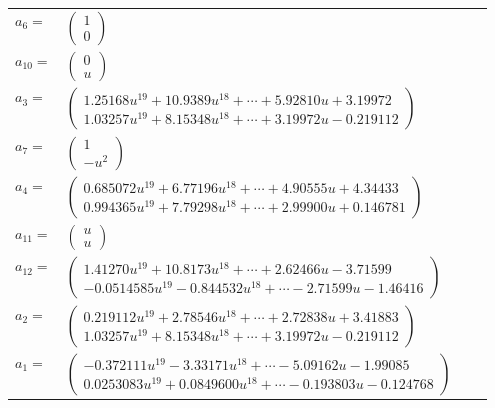 \documentclass[1p]{elsarticle_modified}
\theoremstyle{definition}
\begin{document}
\begin{tabular}{m{7pt} m{180pt} m{7pt} m{180pt} }
\flushright $a_{6}=$&$\begin{pmatrix}1\\0\end{pmatrix}$ \\
\flushright $a_{10}=$&$\begin{pmatrix}0\\u\end{pmatrix}$ \\
\flushright $a_{3}=$&$\begin{pmatrix}1.25168 u^{19}+10.9389 u^{18}+\cdots+5.92810 u+3.19972\\1.03257 u^{19}+8.15348 u^{18}+\cdots+3.19972 u-0.219112\end{pmatrix}$ \\
\flushright $a_{7}=$&$\begin{pmatrix}1\\- u^2\end{pmatrix}$ \\
\flushright $a_{4}=$&$\begin{pmatrix}0.685072 u^{19}+6.77196 u^{18}+\cdots+4.90555 u+4.34433\\0.994365 u^{19}+7.79298 u^{18}+\cdots+2.99900 u+0.146781\end{pmatrix}$ \\
\flushright $a_{11}=$&$\begin{pmatrix}u\\u\end{pmatrix}$ \\
\flushright $a_{12}=$&$\begin{pmatrix}1.41270 u^{19}+10.8173 u^{18}+\cdots+2.62466 u-3.71599\\-0.0514585 u^{19}-0.844532 u^{18}+\cdots-2.71599 u-1.46416\end{pmatrix}$ \\
\flushright $a_{2}=$&$\begin{pmatrix}0.219112 u^{19}+2.78546 u^{18}+\cdots+2.72838 u+3.41883\\1.03257 u^{19}+8.15348 u^{18}+\cdots+3.19972 u-0.219112\end{pmatrix}$ \\
\flushright $a_{1}=$&$\begin{pmatrix}-0.372111 u^{19}-3.33171 u^{18}+\cdots-5.09162 u-1.99085\\0.0253083 u^{19}+0.0849600 u^{18}+\cdots-0.193803 u-0.124768\end{pmatrix}$ \\

\end{tabular}
\end{document}
